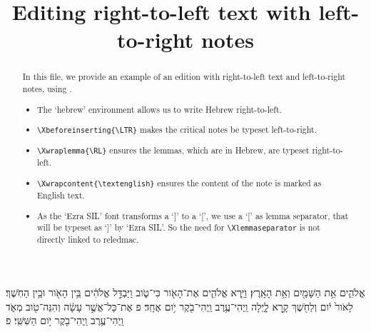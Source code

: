 \documentclass{article}
\title{Editing right-to-left text with left-to-right notes}
\date{}
\newenvironment{hebrew}[2][]{\begin{otherlanguage}{hebrew}}{\end{otherlanguage}}
\begin{document}
\maketitle
\begin{abstract}


In this file, we provide an example of an edition with right-to-left text and left-to-right notes, using \XeLaTeX.

\begin{itemize}
	\item The `hebrew' environment allows us to write Hebrew right-to-left.
	\item \verb+\Xbeforeinserting{\LTR}+ makes the critical notes be typeset left-to-right.
	\item \verb+\Xwraplemma{\RL}+ ensures the lemmas, which are in Hebrew, are typeset right-to-left.
	\item \verb+\Xwrapcontent{\textenglish}+ ensures the content of the note is marked as English text. 
	\item As the `Ezra SIL' font transforms a `]' to a `[', we use a `[' as lemma separator, that will be typeset as `]' by `Ezra SIL'. So the need for \verb+\Xlemmaseparator+ is not directly linked to reledmac.
\end{itemize}

\end{abstract}

\begin{hebrew}
\beginnumbering


\pstart
{} 
אֱלֹהִ֑ים אֵ֥ת הַשָּׁמַ֖יִם וְאֵ֥ת הָאָֽרֶץ׃
וַיַּ֧רְא אֱלֹהִ֛ים אֶת־הָאֹ֖ור כִּי־טֹ֑וב וַיַּבְדֵּ֣ל אֱלֹהִ֔ים בֵּ֥ין הָאֹ֖ור וּבֵ֥ין הַחֹֽשֶׁךְ׃
 לָאֹור֙ יֹ֔ום וְלַחֹ֖שֶׁךְ קָ֣רָא לָ֑יְלָה וַֽיְהִי־עֶ֥רֶב וַֽיְהִי־בֹ֖קֶר יֹ֥ום אֶחָֽד׃ פ
 אֶת־כָּל־אֲשֶׁ֣ר עָשָׂ֔ה וְהִנֵּה־טֹ֖וב מְאֹ֑ד וַֽיְהִי־עֶ֥רֶב וַֽיְהִי־בֹ֖קֶר יֹ֥ום הַשִּׁשִּֽׁי׃ פ

\pend
\endnumbering

\end{hebrew}
\end{document}
